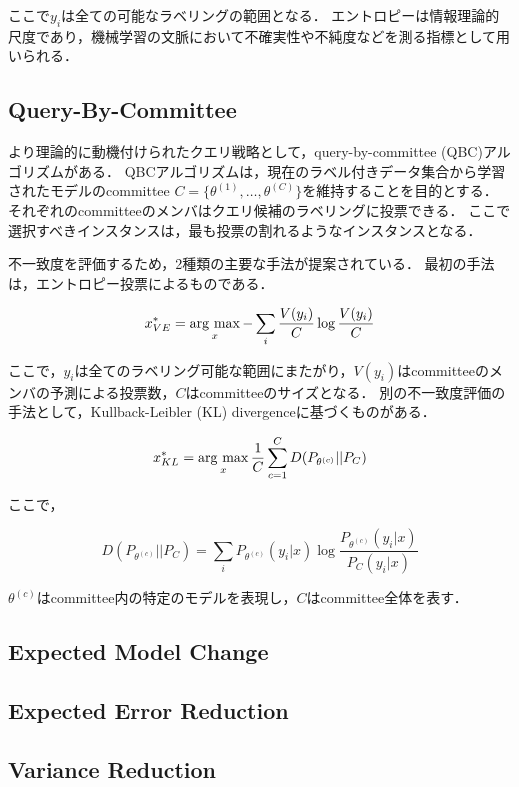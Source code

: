 \documentclass[11pt]{report}
\newcommand{\argmax}{\mathop{\rm arg~max}\limits}
\begin{document}
ここで$y_i$は全ての可能なラベリングの範囲となる．
エントロピーは情報理論的尺度であり，機械学習の文脈において不確実性や不純度などを測る指標として用いられる．

\subsection{Query-By-Committee}
より理論的に動機付けられたクエリ戦略として，query-by-committee (QBC)アルゴリズム\cite{seung1992query}がある．
QBCアルゴリズムは，現在のラベル付きデータ集合から学習されたモデルのcommittee $C = \{\theta^{(1)},\ldots,\theta^{(C)} \}$を維持することを目的とする．
それぞれのcommitteeのメンバはクエリ候補のラベリングに投票できる．
ここで選択すべきインスタンスは，最も投票の割れるようなインスタンスとなる．

不一致度を評価するため，2種類の主要な手法が提案されている．
最初の手法は，エントロピー投票によるものである\cite{dagan1995committee}．

\begin{equation}
    x_{VE}^* = \argmax_{x} - \sum_{i} \frac{V(y_i)}{C} \log \frac{V(y_i)}{C}
\end{equation}

ここで，$y_i$は全てのラベリング可能な範囲にまたがり，$V(y_i)$はcommitteeのメンバの予測による投票数，$C$はcommitteeのサイズとなる．
別の不一致度評価の手法として，Kullback-Leibler (KL) divergenceに基づくものがある\cite{mccallumzy1998employing}．

\begin{equation}
    x_{KL}^* = \argmax_{x} \frac{1}{C} \sum^{C}_{c=1} D(P_{\theta^{(c)}}||P_{C})
\end{equation}

ここで，

\begin{equation}
    D(P_{\theta^{(c)}}||P_{C}) = \sum_{i} P_{\theta^{(c)}}(y_i|x) \log \frac{P_{\theta^{(c)}}(y_i|x)}{P_C(y_i|x)}
\end{equation}

$\theta^{(c)}$はcommittee内の特定のモデルを表現し，$C$はcommittee全体を表す．

\subsection{Expected Model Change}
\subsection{Expected Error Reduction}
\subsection{Variance Reduction}
\end{document}
